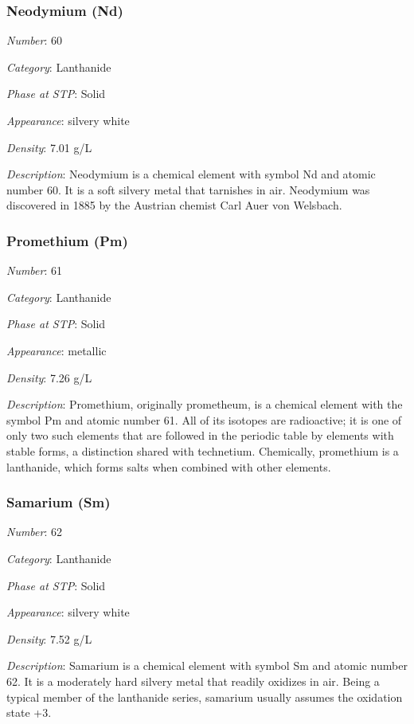 \documentclass{article}
\begin{document}
\hypertarget{subsubsection::Nd}{}\subsubsection{Neodymium (Nd)}

\textit{Number}: 60

\textit{Category}: Lanthanide

\textit{Phase at STP}: Solid

\textit{Appearance}: silvery white

\textit{Density}: 7.01 g/L

\textit{Description}: Neodymium is a chemical element with symbol Nd and atomic number 60. It is a soft silvery metal that tarnishes in air. Neodymium was discovered in 1885 by the Austrian chemist Carl Auer von Welsbach.

\hypertarget{subsubsection::Pm}{}\subsubsection{Promethium (Pm)}

\textit{Number}: 61

\textit{Category}: Lanthanide

\textit{Phase at STP}: Solid

\textit{Appearance}: metallic

\textit{Density}: 7.26 g/L

\textit{Description}: Promethium, originally prometheum, is a chemical element with the symbol Pm and atomic number 61. All of its isotopes are radioactive; it is one of only two such elements that are followed in the periodic table by elements with stable forms, a distinction shared with technetium. Chemically, promethium is a lanthanide, which forms salts when combined with other elements.

\hypertarget{subsubsection::Sm}{}\subsubsection{Samarium (Sm)}

\textit{Number}: 62

\textit{Category}: Lanthanide

\textit{Phase at STP}: Solid

\textit{Appearance}: silvery white

\textit{Density}: 7.52 g/L

\textit{Description}: Samarium is a chemical element with symbol Sm and atomic number 62. It is a moderately hard silvery metal that readily oxidizes in air. Being a typical member of the lanthanide series, samarium usually assumes the oxidation state +3.
\end{document}
